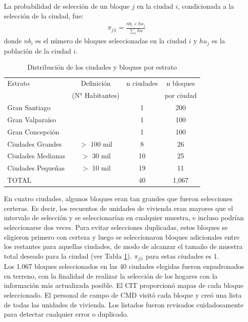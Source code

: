 \documentclass[12pt]{report}
\begin{document}
La probabilidad de selección de un bloque $j$ en la ciudad $i$, condicionada a la selección de la ciudad, fue:
\begin{eqnarray*}
	\pi_{j|i} = \frac{nb_i \times hu_j}{\sum_i hu}
\end{eqnarray*} 
donde $nb_i$ es el número de bloques seleccionadas en la ciudad $i$ y $hu_j$ es la población de la ciudad $i$.\\

\begin{table}[H]
	\centering
	\caption{Distribución de los ciudades y bloques por estrato}
	\label{table:ciudades}
	\begin{tabular}{l c c c}
		\toprule
		Estrato	& Definición      & n ciudades & n bloques \\
		& (N° Habitantes) &            & por ciudad\\			
		\midrule
		Gran Santiago		                    &&  1	&  200  \\
		Gran Valparaíso	&&  1	& 100  \\
		Gran Concepción      &&  1	& 100  \\
		Ciudades Grandes	&   $>$ 100 mil &	8	&  26  \\
		Ciudades Medianas	&   $>$ 30 mil 	&  10	&  25  \\
		Ciudades Pequeñas &	$>$ 10 mil	&  19	&  11  \\
		TOTAL		        &                       & 40	& 1,067 \\
		\bottomrule
	\end{tabular}
\end{table}

En cuatro ciudades, algunos bloques eran tan grandes que fueron selecciones certeras. Es decir, los recuentos de unidades de vivienda eran mayores que el intervalo de selección y se seleccionarían en cualquier muestra, e incluso podrían seleccionarse dos veces. Para evitar selecciones duplicadas, estos bloques se eligieron primero con certeza y luego se seleccionaron bloques adicionales entre los restantes para aquellas ciudades, de modo de alcanzar el tamaño de muestra total deseado para la ciudad (ver Tabla \ref{table:ciudades}). $\pi_{j|i}$ para estas ciudades es 1.\\

Los 1.067 bloques seleccionados en las 40 ciudades elegidas fueron enpadronados en terreno, con la finalidad de realizar la selección de los hogares con la información más actualizada posible. El CIT proporcionó mapas de cada bloque seleccionado. El personal de campo de CMD visitó cada bloque y creó una lista de todas las unidades de vivienda. Los listados fueron revisados cuidadosamente para detectar cualquier error o duplicado.\\
\end{document}

